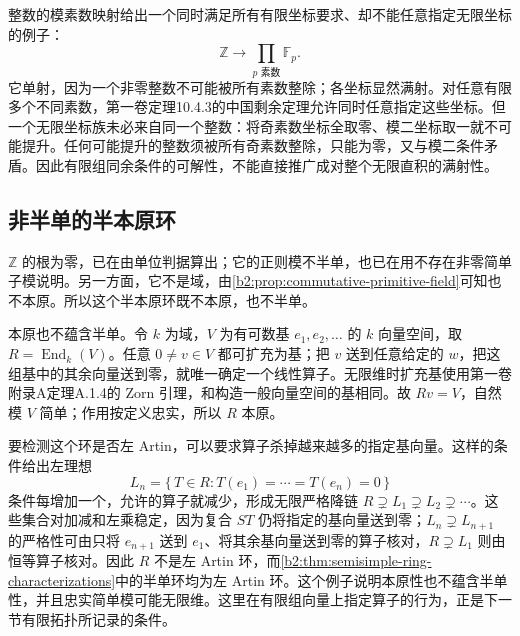 整数的模素数映射给出一个同时满足所有有限坐标要求、却不能任意指定无限坐标的例子：
\[
	\mathbb Z\longrightarrow\prod_{p\text{ 素数}}\mathbb F_p.
\]
它单射，因为一个非零整数不可能被所有素数整除；各坐标显然满射。对任意有限多个不同素数，第一卷定理10.4.3的中国剩余定理允许同时任意指定这些坐标。但一个无限坐标族未必来自同一个整数：将奇素数坐标全取零、模二坐标取一就不可能提升。任何可能提升的整数须被所有奇素数整除，只能为零，又与模二条件矛盾。因此有限组同余条件的可解性，不能直接推广成对整个无限直积的满射性。

\subsection{非半单的半本原环}
\label{b2:subsec:1403:03}

\(\mathbb Z\) 的根为零，已在由单位判据算出；它的正则模不半单，也已在用不存在非零简单子模说明。另一方面，它不是域，由\cref{b2:prop:commutative-primitive-field}可知也不本原。所以这个半本原环既不本原，也不半单。

\ProseParagraphBreak
本原也不蕴含半单。令 \(k\) 为域，\(V\) 为有可数基 \(e_1,e_2,\ldots\) 的 \(k\) 向量空间，取 \(R=\operatorname{End}_k(V)\)。任意 \(0\ne v\in V\) 都可扩充为基；把 \(v\) 送到任意给定的 \(w\)，把这组基中的其余向量送到零，就唯一确定一个线性算子。无限维时扩充基使用第一卷附录A定理A.1.4的 Zorn 引理，和构造一般向量空间的基相同。故 \(Rv=V\)，自然模 \(V\) 简单；作用按定义忠实，所以 \(R\) 本原。

\ProseParagraphBreak
要检测这个环是否左 Artin，可以要求算子杀掉越来越多的指定基向量。这样的条件给出左理想
\[
	L_n=\bigl\{\,T\in R:T(e_1)=\cdots=T(e_n)=0\,\bigr\}
\]
条件每增加一个，允许的算子就减少，形成无限严格降链 \(R\supsetneq L_1\supsetneq L_2\supsetneq\cdots\)。这些集合对加减和左乘稳定，因为复合 \(ST\) 仍将指定的基向量送到零；\(L_n\supsetneq L_{n+1}\) 的严格性可由只将 \(e_{n+1}\) 送到 \(e_1\)、将其余基向量送到零的算子核对，\(R\supsetneq L_1\) 则由恒等算子核对。因此 \(R\) 不是左 Artin 环，而\cref{b2:thm:semisimple-ring-characterizations}中的半单环均为左 Artin 环。这个例子说明本原性也不蕴含半单性，并且忠实简单模可能无限维。这里在有限组向量上指定算子的行为，正是下一节有限拓扑所记录的条件。
